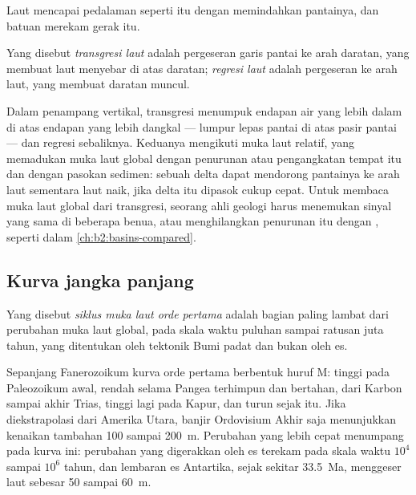 Laut mencapai pedalaman seperti itu dengan memindahkan pantainya, dan batuan merekam gerak itu.

\begin{definition}\label{def:b2:phanerozoic-earth:transgression}
Yang disebut \emph{transgresi laut} adalah pergeseran garis pantai ke arah daratan,
yang membuat laut menyebar di atas daratan; \emph{regresi laut} adalah
pergeseran ke arah laut, yang membuat daratan muncul.
\end{definition}

Dalam penampang vertikal, transgresi menumpuk endapan air yang lebih dalam di atas endapan yang lebih dangkal ---
lumpur lepas pantai di atas pasir pantai --- dan regresi sebaliknya. Keduanya mengikuti muka laut
relatif, yang memadukan muka laut global dengan penurunan atau pengangkatan tempat itu dan dengan
pasokan sedimen: sebuah delta dapat mendorong pantainya ke arah laut sementara laut naik, jika delta itu dipasok cukup
cepat. Untuk membaca muka laut global dari transgresi, seorang ahli geologi harus menemukan sinyal yang sama
di beberapa benua, atau menghilangkan penurunan itu dengan , seperti dalam
\cref{ch:b2:basins-compared}.

\subsection*{Kurva jangka panjang}

\begin{definition}\label{def:b2:phanerozoic-earth:first-order}
Yang disebut \emph{siklus muka laut orde pertama} adalah bagian paling lambat dari
perubahan muka laut global, pada skala waktu puluhan sampai ratusan juta tahun, yang ditentukan oleh
tektonik Bumi padat dan bukan oleh es.
\end{definition}

Sepanjang Fanerozoikum kurva orde pertama berbentuk huruf M: tinggi pada Paleozoikum awal,
rendah selama Pangea terhimpun dan bertahan, dari Karbon sampai akhir Trias, tinggi
lagi pada Kapur, dan turun sejak itu. Jika diekstrapolasi dari Amerika Utara, banjir Ordovisium
Akhir saja menunjukkan kenaikan tambahan 100 sampai \qty{200}{m}.
Perubahan yang lebih cepat menumpang pada kurva ini: perubahan yang digerakkan oleh es terekam pada skala waktu $10^4$ sampai
$10^6$ tahun, dan lembaran es Antartika, sejak sekitar \qty{33.5}{Ma}, menggeser laut sebesar 50 sampai
\qty{60}{m}.

